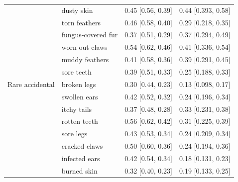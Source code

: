 \documentclass[10pt,letterpaper]{article}
\begin{document}
\begin{table}[h]
\begin{tabular}{| l || l | l | l |}
                  & dusty skin         & 0.45 {[}0.56, 0.39{]}   & 0.44 {[}0.393, 0.58{]}       \\
                  & torn feathers      & 0.46 {[}0.58, 0.40{]}   & 0.29 {[}0.218, 0.35{]}       \\
                  & fungus-covered fur & 0.37 {[}0.51, 0.29{]}   & 0.37 {[}0.294, 0.49{]}       \\
                  & worn-out claws     & 0.54 {[}0.62, 0.46{]}   & 0.41 {[}0.336, 0.54{]}       \\
                  & muddy feathers     & 0.41 {[}0.58, 0.36{]}   & 0.39 {[}0.291, 0.45{]}       \\
                  & sore teeth         & 0.39 {[}0.51, 0.33{]}   & 0.25 {[}0.188, 0.33{]}       \\
Rare accidental   & broken legs        & 0.30 {[}0.44, 0.23{]}   & 0.13 {[}0.098, 0.17{]}       \\
                  & swollen ears       & 0.42 {[}0.52, 0.32{]}   & 0.24 {[}0.196, 0.34{]}       \\
                  & itchy tails        & 0.37 {[}0.48, 0.28{]}   & 0.33 {[}0.231, 0.38{]}       \\
                  & rotten teeth       & 0.56 {[}0.62, 0.42{]}   & 0.31 {[}0.225, 0.39{]}       \\
                  & sore legs          & 0.43 {[}0.53, 0.34{]}   & 0.24 {[}0.209, 0.34{]}       \\
                  & cracked claws      & 0.50 {[}0.60, 0.36{]}   & 0.24 {[}0.194, 0.36{]}       \\
                  & infected ears      & 0.42 {[}0.54, 0.34{]}   & 0.18 {[}0.131, 0.23{]}       \\
                  & burned skin        & 0.32 {[}0.40, 0.23{]}   & 0.19 {[}0.133, 0.25{]}      \\
                         \hline

\end{tabular}
\end{table}
    
    
    
\end{document}
